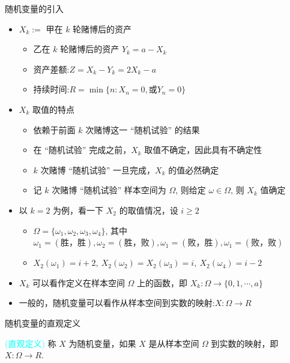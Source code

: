 \begin{frame}{随机变量的引入}
	\begin{itemize}[<+-|alert@+>]
		\item $X_k:=$ 甲在 $k$ 轮赌博后的资产
		      \begin{itemize}[<+-|alert@+>]
			      \item 乙在 $k$ 轮赌博后的资产 $Y_k=a-X_k$
			      \item 资产差额:$Z=X_k-Y_k=2X_k-a$
			      \item 持续时间:$R=\min\{n: X_n=0, \mbox{或} Y_n=0\}$
		      \end{itemize}
		\item $X_k$ 取值的特点
		      \begin{itemize}[<+-|alert@+>]
			      \item 依赖于前面 $k$ 次赌博这一 “随机试验” 的结果
			      \item 在 “随机试验” 完成之前，$X_k$ 取值不确定，因此具有不确定性
			      \item $k$ 次赌博 “随机试验” 一旦完成，$X_k$ 的值必然确定
			      \item 记 $k$ 次赌博 “随机试验” 样本空间为 $\Omega$, 则给定 $\omega\in\Omega$, 则 $X_k$ 值确定
		      \end{itemize}
		\item 以 $k=2$ 为例，看一下 $X_2$ 的取值情况，设 $i\geq 2$
		      \begin{itemize}[<+-|alert@+>]
			      \item $\Omega=\{\omega_1,\omega_2, \omega_3,\omega_4\}$, 其中 $\omega_1=(\mbox{胜，胜}), \omega_2=(\mbox{胜，败}), \omega_1=(\mbox{败，胜}), \omega_1=(\mbox{败，败})$
			      \item $X_2(\omega_1)=i+2,\  X_2(\omega_2)=X_2(\omega_3)=i,\  X_2(\omega_4)=i-2$
		      \end{itemize}
		\item $X_k$ 可以看作定义在样本空间 $\Omega$ 上的函数，即 $X_k:\Omega\rightarrow \{0, 1,\cdots, a\}$
		\item 一般的，随机变量可以看作从样本空间到实数的映射:$X:\Omega\rightarrow R$

	\end{itemize}

\end{frame}
\begin{frame}{随机变量的直观定义}
	\begin{defi} \textcolor{cyan}{(直观定义)}
		称 $X$ 为随机变量，如果 $X$ 是从样本空间 $\Omega$ 到实数的映射，即 $X:\Omega\rightarrow R$.
	\end{defi}

\end{frame}
